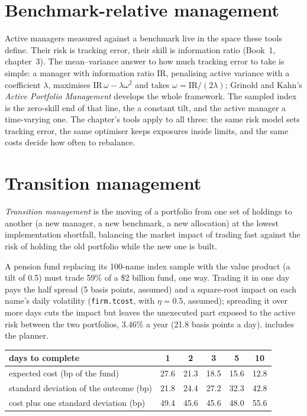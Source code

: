 \section{Benchmark-relative management}

Active managers measured against a benchmark live in the space these tools define. Their risk is tracking error, their skill is information ratio
(Book~1, chapter~3). The mean--variance answer to how much tracking error to take is simple: a manager with information ratio IR, penalising active
variance with a coefficient $\lambda$, maximises $\text{IR}\,\omega - \lambda\omega^2$ and takes $\omega = \text{IR}/(2\lambda)$; Grinold and Kahn's
\emph{Active Portfolio Management} develops the whole framework. The sampled index is the zero-skill end of that line, the  a
constant tilt, and the active manager a time-varying one. The chapter's tools apply to all three: the same risk model sets tracking error, the same
optimiser keeps exposures inside limits, and the same costs decide how often to rebalance.

\section{Transition management}

\begin{definition}\label{def:s1:the-asset-managers-strategies:transition}
\emph{Transition management} is the moving of a portfolio from one set of holdings to another (a new manager, a new
benchmark, a new allocation) at the lowest implementation shortfall, balancing the market impact of trading fast against the risk of holding the old
portfolio while the new one is built.
\end{definition}

A pension fund replacing its 100-name index sample with the value product (a tilt of 0.5) must trade 59\% of a \$2 billion fund, one way. Trading it in
one day pays the half spread (5 basis points, assumed) and a square-root impact on each name's daily volatility (\texttt{firm.tcost}, with $\eta = 0.5$,
assumed); spreading it over more days cuts the impact but leaves the unexecuted part exposed to the active risk between the two portfolios, 3.46\% a
year (21.8 basis points a day).  includes the planner.

\begin{center}
\small
\begin{tabular}{@{}lccccc@{}}
\toprule
days to complete & 1 & 2 & 3 & 5 & 10\\
\midrule
expected cost (bp of the fund) & 27.6 & 21.3 & 18.5 & 15.6 & 12.8\\
standard deviation of the outcome (bp) & 21.8 & 24.4 & 27.2 & 32.3 & 42.8\\
cost plus one standard deviation (bp) & 49.4 & 45.6 & 45.6 & 48.0 & 55.6\\
\bottomrule
\end{tabular}
\end{center}

